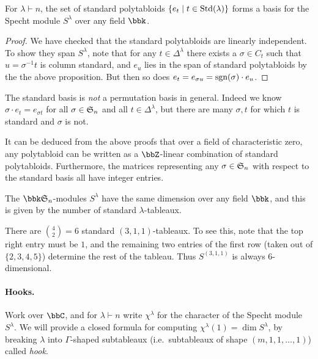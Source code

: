 \begin{theorem}
    For $\lambda\vdash n$, the set of standard polytabloids $\{e_t\;|\; t\in
    \textnormal{Std}(\lambda)\}$ forms a basis for the Specht
    module $S^\lambda$ over any field $\bbk$.

    \begin{proof}
        We have checked that the standard polytabloids are linearly independent.
        To show they span $S^\lambda$, note that for any $t\in \Delta^\lambda$
        there exists a $\sigma\in C_t$ such that $u=\sigma^{-1} t$ is column
        standard, and $e_u$ lies in the span of standard polytabloids by the the
        above proposition. But then so does $e_t = e_{\sigma u} =
        \textnormal{sgn}(\sigma)\cdot e_u$.
    \end{proof}
\end{theorem}

\begin{remark}
    The standard basis is \emph{not} a permutation basis in general. Indeed we
    know $\sigma\cdot e_t = e_{\sigma t}$ for all $\sigma\in \mathfrak{S}_{n}$ and all
    $t\in \Delta^\lambda$, but there are many $\sigma, t$ for which $t$ is
    standard and $\sigma$ is not.
\end{remark}

\begin{remark}
    It can be deduced from the above proofs that over a field of characteristic
    zero, any polytabloid can be written as a $\bbZ$-linear combination of
    standard polytabloids. Furthermore, the matrices representing any $\sigma\in
    \mathfrak{S}_{n}$ with respect to the standard basis all have integer entries.
\end{remark}

\begin{corollary}
    The $\bbk \sym n$-modules $S^\lambda$ have the same dimension over any
    field $\bbk$, and this is given by the number of standard
    $\lambda$-tableaux.
\end{corollary}

\begin{example}
    There are $\binom{4}{2}=6$ standard $(3,1,1)$-tableaux. To see this, note that
    the top right entry must be $1$, and the remaining two entries of the first
    row (taken out of $\{2,3,4,5\}$) determine the rest of the tableau. Thus $S^{(3,1,1)}$ is always $6$-dimensional.
\end{example}

\paragraph{Hooks.} Work over $\bbC$, and for $\lambda\vdash n$ write
$\chi^\lambda$ for the character of the Specht module $S^\lambda$. We will
provide a closed formula for computing $\chi^\lambda(1)=\dim S^\lambda$, by
breaking $\lambda$ into $\Gamma$-shaped subtableaux (i.e.\ subtableaux of shape
$(m,1,1,\ldots, 1)$) called \emph{hook}.

